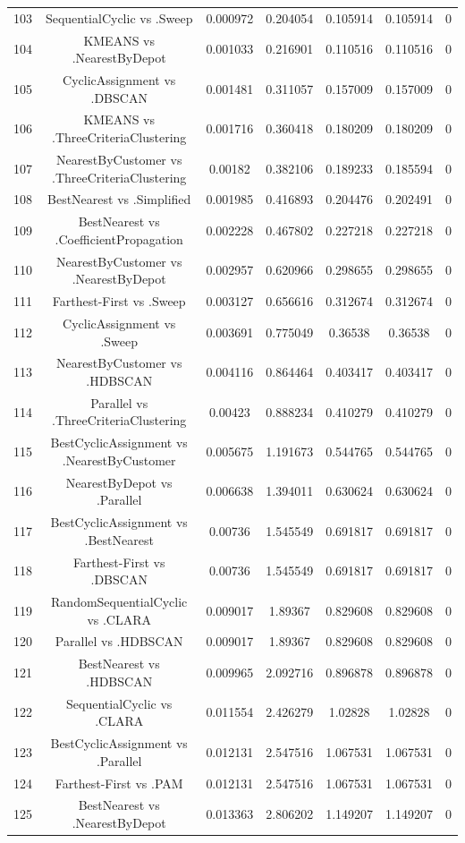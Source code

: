 \documentclass[a4paper,10pt]{article}
\begin{document}
\begin{landscape}
\begin{table}[!htp]
\begin{tabular}{ccccccc}
103&SequentialCyclic vs .Sweep&0.000972&0.204054&0.105914&0.105914&0\\
104&KMEANS vs .NearestByDepot&0.001033&0.216901&0.110516&0.110516&0\\
105&CyclicAssignment vs .DBSCAN&0.001481&0.311057&0.157009&0.157009&0\\
106&KMEANS vs .ThreeCriteriaClustering&0.001716&0.360418&0.180209&0.180209&0\\
107&NearestByCustomer vs .ThreeCriteriaClustering&0.00182&0.382106&0.189233&0.185594&0\\
108&BestNearest vs .Simplified&0.001985&0.416893&0.204476&0.202491&0\\
109&BestNearest vs .CoefficientPropagation&0.002228&0.467802&0.227218&0.227218&0\\
110&NearestByCustomer vs .NearestByDepot&0.002957&0.620966&0.298655&0.298655&0\\
111&Farthest-First vs .Sweep&0.003127&0.656616&0.312674&0.312674&0\\
112&CyclicAssignment vs .Sweep&0.003691&0.775049&0.36538&0.36538&0\\
113&NearestByCustomer vs .HDBSCAN&0.004116&0.864464&0.403417&0.403417&0\\
114&Parallel vs .ThreeCriteriaClustering&0.00423&0.888234&0.410279&0.410279&0\\
115&BestCyclicAssignment vs .NearestByCustomer&0.005675&1.191673&0.544765&0.544765&0\\
116&NearestByDepot vs .Parallel&0.006638&1.394011&0.630624&0.630624&0\\
117&BestCyclicAssignment vs .BestNearest&0.00736&1.545549&0.691817&0.691817&0\\
118&Farthest-First vs .DBSCAN&0.00736&1.545549&0.691817&0.691817&0\\
119&RandomSequentialCyclic vs .CLARA&0.009017&1.89367&0.829608&0.829608&0\\
120&Parallel vs .HDBSCAN&0.009017&1.89367&0.829608&0.829608&0\\
121&BestNearest vs .HDBSCAN&0.009965&2.092716&0.896878&0.896878&0\\
122&SequentialCyclic vs .CLARA&0.011554&2.426279&1.02828&1.02828&0\\
123&BestCyclicAssignment vs .Parallel&0.012131&2.547516&1.067531&1.067531&0\\
124&Farthest-First vs .PAM&0.012131&2.547516&1.067531&1.067531&0\\
125&BestNearest vs .NearestByDepot&0.013363&2.806202&1.149207&1.149207&0\\

\end{tabular}
\end{table}
\end{landscape}
\end{document}
